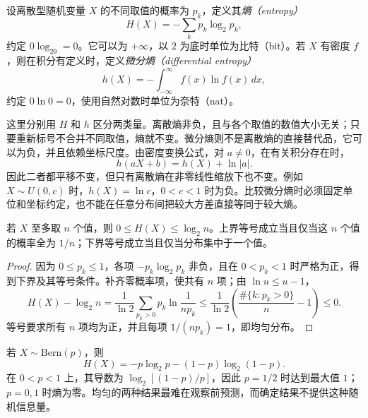 \begin{definition}
\label{def:study-entropy}
设离散型随机变量 $X$ 的不同取值的概率为 $p_k$，定义其\emph{熵（entropy）}
\begin{equation}
  H(X)=-\sum_kp_k\log_2p_k,
  \label{eq:study-discrete-entropy}
\end{equation}
约定 $0\log_20=0$。它可以为 $+\infty$，以 $2$ 为底时单位为比特（bit）。若 $X$ 有密度 $f$，则在积分有定义时，定义\emph{微分熵（differential entropy）}
\begin{equation}
  h(X)=-\int_{-\infty}^{\infty}f(x)\ln f(x)\,dx,
  \label{eq:study-differential-entropy}
\end{equation}
约定 $0\ln0=0$，使用自然对数时单位为奈特（nat）。
\end{definition}

这里分别用 $H$ 和 $h$ 区分两类量。离散熵非负，且与各个取值的数值大小无关；只要重新标号不合并不同取值，熵就不变。微分熵则不是离散熵的直接替代品，它可以为负，并且依赖坐标尺度。由密度变换公式，对 $a\ne0$，在有关积分存在时，
\begin{equation}
  h(aX+b)=h(X)+\ln|a|.
  \label{eq:study-entropy-scale}
\end{equation}
因此二者都平移不变，但只有离散熵在非零线性缩放下也不变。例如 $X\sim U(0,c)$ 时，$h(X)=\ln c$，$0<c<1$ 时为负。比较微分熵时必须固定单位和坐标约定，也不能在任意分布间把较大方差直接等同于较大熵。

\begin{proposition}
\label{prop:study-discrete-max-entropy}
若 $X$ 至多取 $n$ 个值，则 $0\le H(X)\le\log_2n$。上界等号成立当且仅当这 $n$ 个值的概率全为 $1/n$；下界等号成立当且仅当分布集中于一个值。
\end{proposition}

\begin{proof}
因为 $0\le p_k\le1$，各项 $-p_k\log_2p_k$ 非负，且在 $0<p_k<1$ 时严格为正，得到下界及其等号条件。补齐零概率项，使共有 $n$ 项；由 $\ln u\le u-1$，
\[
  H(X)-\log_2n
    =\frac1{\ln2}\sum_{p_k>0}p_k\ln\frac1{np_k}
    \le\frac1{\ln2}\left(\frac{\#\{k:p_k>0\}}n-1\right)
    \le0.
\]
等号要求所有 $n$ 项均为正，并且每项 $1/(np_k)=1$，即均匀分布。
\end{proof}

\begin{example}
\label{ex:study-bernoulli-entropy}
若 $X\sim\mathrm{Bern}(p)$，则
\[
  H(X)=-p\log_2p-(1-p)\log_2(1-p).
\]
在 $0<p<1$ 上，其导数为 $\log_2[(1-p)/p]$，因此 $p=1/2$ 时达到最大值 $1$；$p=0,1$ 时熵为零。均匀的两种结果最难在观察前预测，而确定结果不提供这种随机信息量。
\end{example}

